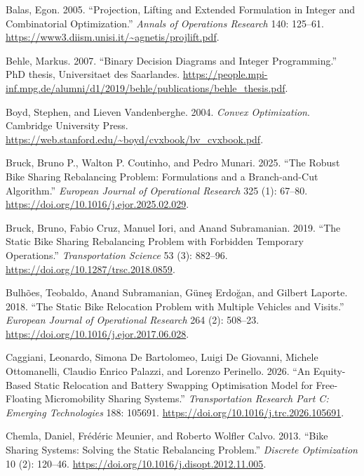 \documentclass[
  american,
  11pt,
]{article}
\newlength{\cslhangindent}
\newenvironment{CSLReferences}[2] %
 {\begin{list}{}{%
  \setlength{\itemindent}{0pt}
  \setlength{\leftmargin}{0pt}
  \setlength{\parsep}{0pt}
  \ifodd #1
   \setlength{\leftmargin}{\cslhangindent}
   \setlength{\itemindent}{-1\cslhangindent}
  \fi
  \setlength{\itemsep}{#2\baselineskip}}}
 {\end{list}}
\begin{document}
\protect{}\label{refs}
\begin{CSLReferences}{1}{1}
Balas, Egon. 2005. {``Projection, Lifting and Extended Formulation in
Integer and Combinatorial Optimization.''} \emph{Annals of Operations
Research} 140: 125--61.
\url{https://www3.diism.unisi.it/~agnetis/projlift.pdf}.

Behle, Markus. 2007. {``Binary Decision Diagrams and Integer
Programming.''} PhD thesis, Universitaet des Saarlandes.
\url{https://people.mpi-inf.mpg.de/alumni/d1/2019/behle/publications/behle_thesis.pdf}.

Boyd, Stephen, and Lieven Vandenberghe. 2004. \emph{Convex
Optimization}. Cambridge University Press.
\url{https://web.stanford.edu/~boyd/cvxbook/bv_cvxbook.pdf}.

Bruck, Bruno P., Walton P. Coutinho, and Pedro Munari. 2025. {``The
Robust Bike Sharing Rebalancing Problem: Formulations and a
Branch-and-Cut Algorithm.''} \emph{European Journal of Operational
Research} 325 (1): 67--80.
\url{https://doi.org/10.1016/j.ejor.2025.02.029}.

Bruck, Bruno, Fabio Cruz, Manuel Iori, and Anand Subramanian. 2019.
{``The Static Bike Sharing Rebalancing Problem with Forbidden Temporary
Operations.''} \emph{Transportation Science} 53 (3): 882--96.
\url{https://doi.org/10.1287/trsc.2018.0859}.

Bulhões, Teobaldo, Anand Subramanian, Güneş Erdoğan, and Gilbert
Laporte. 2018. {``The Static Bike Relocation Problem with Multiple
Vehicles and Visits.''} \emph{European Journal of Operational Research}
264 (2): 508--23. \url{https://doi.org/10.1016/j.ejor.2017.06.028}.

Caggiani, Leonardo, Simona De Bartolomeo, Luigi De Giovanni, Michele
Ottomanelli, Claudio Enrico Palazzi, and Lorenzo Perinello. 2026. {``An
Equity-Based Static Relocation and Battery Swapping Optimisation Model
for Free-Floating Micromobility Sharing Systems.''} \emph{Transportation
Research Part C: Emerging Technologies} 188: 105691.
\url{https://doi.org/10.1016/j.trc.2026.105691}.

Chemla, Daniel, Frédéric Meunier, and Roberto Wolfler Calvo. 2013.
{``Bike Sharing Systems: Solving the Static Rebalancing Problem.''}
\emph{Discrete Optimization} 10 (2): 120--46.
\url{https://doi.org/10.1016/j.disopt.2012.11.005}.


\end{CSLReferences}
\end{document}
